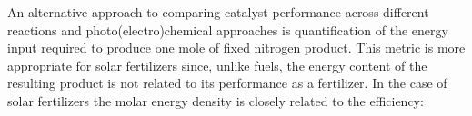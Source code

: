 

An alternative approach to comparing catalyst performance across different reactions and photo(electro)chemical approaches is quantification of the energy input required to produce one mole of fixed nitrogen product. This metric is more appropriate for solar fertilizers since, unlike fuels, the energy content of the resulting product is not related to its performance as a fertilizer. In the case of solar fertilizers the molar energy density is closely related to the efficiency:

